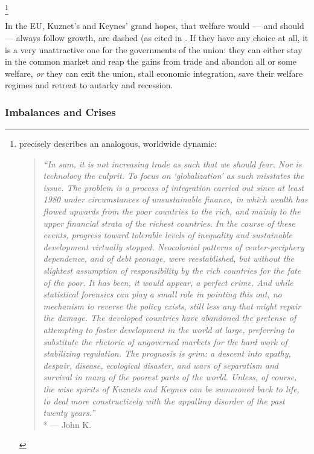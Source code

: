\footnote{
	\citeauthor[25]{Galbraith2002a} precisely describes an analogous, worldwide dynamic:

	\begin{quote}
		\emph{``In sum, it is not increasing trade \emph{as such} that we should fear.
		Nor is technolocy the culprit.
		To focus on `globalization' as such misstates the issue.
		The problem is a process of integration carried out since at least 1980 under circumstances of unsustainable finance, in which wealth has flowed upwards from the poor countries to the rich, and mainly to the upper financial strata of the richest countries.
		In the course of these events, progress toward tolerable levels of inequality and sustainable development virtually stopped.
		Neocolonial patterns of center-periphery dependence, and of debt peonage, were reestablished, but without the slightest assumption of responsibility by the rich countries for the fate of the poor.
		It has been, it would appear, a perfect crime.
		And while statistical forensics can play a small role in pointing this out, no mechanism to reverse the policy exists, still less any that might repair the damage.
		The developed countries have abandoned the pretense of attempting to foster development in the world at large, preferring to substitute the rhetoric of ungoverned markets for the hard work of stabilizing regulation.
		The prognosis is grim:
		a descent into apathy, despair, disease, ecological disaster, and wars of separatism and survival in many of the poorest parts of the world.
		Unless, of course, the wise spirits of Kuznets and Keynes can be summoned back to life, to deal more constructively with the appalling disorder of the past twenty years.''}
		\\*
		--- John K.\ \citet[25]{Galbraith2002a}
	\end{quote}
}

In the \gls{EU}, Kuznet's and Keynes' grand hopes, that welfare would --- and should --- always follow growth, are dashed (as cited in \cite[22]{Galbraith2002a}.
If they have any choice at all, it is a very unattractive one for the governments of the union:
they can either stay in the common market and reap the gains from trade and abandon all or some welfare, \emph{or} they can exit the union, stall economic integration, save their welfare regimes and retreat to autarky and recession.

\subsubsection{Imbalances and Crises}
	\label{sec:imbalances}

